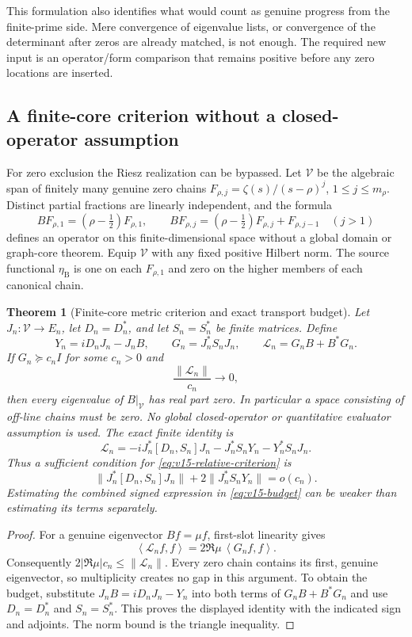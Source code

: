 \documentclass[11pt]{article}
\newtheorem{theorem}{Theorem}[section]
\theoremstyle{remark}
\newcommand{\ip}[2]{\left\langle #1,#2\right\rangle}
\begin{document}
This formulation also identifies what would count as genuine progress from the finite-prime side.  Mere convergence of eigenvalue lists, or convergence of the determinant after zeros are already matched, is not enough.  The required new input is an operator/form comparison that remains positive before any zero locations are inserted.

\subsection*{A finite-core criterion without a closed-operator assumption}
For zero exclusion the Riesz realization can be bypassed. Let $\mathcal V$
be the algebraic span of finitely many genuine zero chains
$F_{\rho,j}=\zeta(s)/(s-\rho)^j$, $1\le j\le m_\rho$. Distinct partial
fractions are linearly independent, and the formula
\[
 B F_{\rho,1}=(\rho-\tfrac12)F_{\rho,1},\qquad
 B F_{\rho,j}=(\rho-\tfrac12)F_{\rho,j}+F_{\rho,j-1}\quad(j>1)
\]
defines an operator on this finite-dimensional space without a global
domain or graph-core theorem. Equip $\mathcal V$ with any fixed positive
Hilbert norm. The source functional $\eta_{\mathrm B}$ is one on each
$F_{\rho,1}$ and zero on the higher members of each canonical chain.

\begin{theorem}[Finite-core metric criterion and exact transport budget]
\label{thm:v15-finite-metric}
Let $J_n:\mathcal V\to E_n$, let $D_n=D_n^*$, and let $S_n=S_n^*$
be finite matrices. Define
\[
 Y_n=iD_nJ_n-J_nB,\qquad G_n=J_n^*S_nJ_n,
 \qquad \mathcal L_n=G_nB+B^*G_n.
\]
If $G_n\succeq c_n I$ for some $c_n>0$ and
\begin{equation}\label{eq:v15-relative-criterion}
 \frac{\|\mathcal L_n\|}{c_n}\longrightarrow0,
\end{equation}
then every eigenvalue of $B|_{\mathcal V}$ has real part zero.
In particular a space consisting of off-line chains must be zero.
No global closed-operator or quantitative evaluator assumption is used.
The exact finite identity is
\begin{equation}\label{eq:v15-budget}
 \boxed{\mathcal L_n
 =-iJ_n^*[D_n,S_n]J_n-J_n^*S_nY_n-Y_n^*S_nJ_n.}
\end{equation}
Thus a sufficient condition for \eqref{eq:v15-relative-criterion} is
\[
 \|J_n^*[D_n,S_n]J_n\|+2\|J_n^*S_nY_n\|=o(c_n).
\]
Estimating the combined signed expression in \eqref{eq:v15-budget}
can be weaker than estimating its terms separately.
\end{theorem}
\begin{proof}
For a genuine eigenvector $Bf=\mu f$, first-slot linearity gives
\[
 \ip{\mathcal L_n f}{f}=2\Re\mu\,\ip{G_nf}{f}.
\]
Consequently $2|\Re\mu|c_n\le\|\mathcal L_n\|$. Every zero chain
contains its first, genuine eigenvector, so multiplicity creates no gap
in this argument. To obtain the budget, substitute
$J_nB=iD_nJ_n-Y_n$ into both terms of $G_nB+B^*G_n$ and use
$D_n=D_n^*$ and $S_n=S_n^*$. This proves the displayed identity with
the indicated sign and adjoints. The norm bound is the triangle inequality.
\end{proof}
\end{document}
